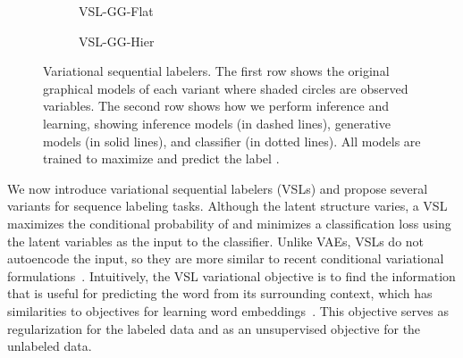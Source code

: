 \documentclass[11pt,a4paper]{article}
\newcommand{\vsmggflat}{VSL-GG-Flat\xspace}
\newcommand{\vsmgghier}{VSL-GG-Hier\xspace}
\begin{document}
\begin{figure}[t]
\begin{subfigure}[b]{.15\textwidth}
         \caption{\vsmggflat}
        \label{model:2gauss_ind}
    \end{subfigure}\begin{subfigure}[b]{.15\textwidth}
    \centering
                 \caption{\vsmgghier}
        \label{model:2gauss_cond}
    \end{subfigure}
    \caption{Variational sequential labelers. The first row shows the original graphical models of each variant where shaded circles are observed variables. The second row shows how we perform inference and learning, showing inference models (in dashed lines), generative models (in solid lines), and classifier (in dotted lines). All models are trained to maximize  and predict the label .}
    \label{fig1}
\end{figure}

We now introduce variational sequential labelers (VSLs) and propose several variants for sequence labeling tasks. Although the latent structure varies, a VSL maximizes the conditional probability of  and minimizes a classification loss using the latent variables as the input to the classifier. Unlike VAEs, VSLs do not autoencode the input, so they are more similar
to recent conditional variational formulations~\citep{sohn2015learning,miao2016neural,zhou2017multi}.
Intuitively, the VSL variational objective is to find the information that is useful for predicting the word  from its surrounding context, which has similarities to objectives for learning word embeddings~\citep{Collobert:2011:NLP:1953048.2078186,mikolov2013efficient}. This objective serves as regularization for the labeled data and as an unsupervised objective for the unlabeled data.
\end{document}
